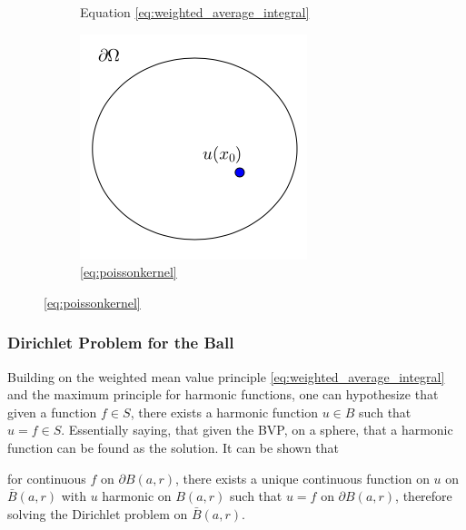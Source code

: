 \begin{figure}[!htb]
\begin{subfigure}[b]{0.3\textwidth}
  \label{fig:generaloffset}
  \caption{Equation \ref{eq:weighted_average_integral}}
\end{subfigure}
\hfill
  \begin{subfigure}[b]{0.3\textwidth}
    \centering
  \includegraphics[width=\textwidth]{styles/CircOffset}
  \caption{\ref{eq:poissonkernel}}\label{fig:circoffset}
\end{subfigure}
\end{figure}
  \subsubsection{Dirichlet Problem for the Ball}
  Building on the weighted mean value principle \eqref{eq:weighted_average_integral}
   and the maximum principle for harmonic functions,
   one can hypothesize that given a function $f \in S$, there exists a harmonic function
   $u \in B$ such that $u = f \in S$. Essentially saying, that given the \gls{BVP},
  on a sphere, that a harmonic function can be found as the solution.
   It can be shown that
\begin{theorem}
  for continuous $f$ on  $\partial B(a,r)$,
there exists a unique continuous function on $u$ on $\bar{B}(a,r)$ with $u$ harmonic on
$B(a,r)$ such that $ u = f $ on
$\partial B(a,r)$, therefore solving the Dirichlet problem on $\bar{B}(a,r)$\cite{Axler1992}.
\end{theorem}
